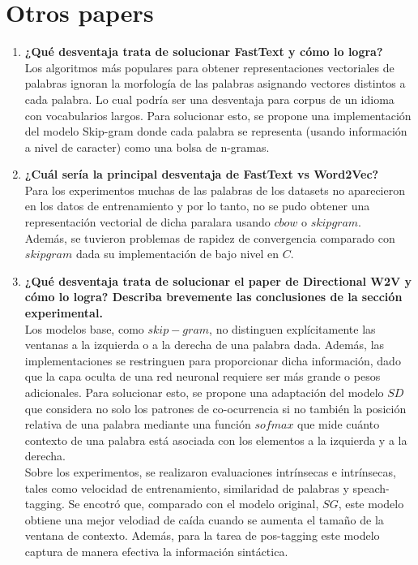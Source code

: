 \documentclass[11pt,letterpaper]{article}
\theoremstyle{definition}
\theoremstyle{definition}
\theoremstyle{definition}
\begin{document}
\section{Otros papers}
\begin{enumerate}
	\item \textbf{¿Qué desventaja trata de solucionar FastText y cómo lo logra?}
	\\
	Los algoritmos más populares para obtener representaciones vectoriales de palabras ignoran la morfología de las palabras asignando vectores distintos a cada palabra. Lo cual podría ser una desventaja para corpus de un idioma con vocabularios largos. Para solucionar esto, se propone una implementación del modelo Skip-gram donde cada palabra se representa (usando información a nivel de caracter) como una bolsa de n-gramas.
	\item \textbf{¿Cuál sería la principal desventaja de FastText vs Word2Vec?}	
	\\
	Para los experimentos muchas de las palabras de los datasets no aparecieron en los datos de entrenamiento y por lo tanto, no se pudo obtener una representación vectorial de dicha paralara usando $ cbow $ o $ skipgram $.
	\\
	Además, se tuvieron problemas de rapidez de convergencia comparado con $ skipgram $ dada su implementación de bajo nivel en $ C $.
	\item \textbf{¿Qué desventaja trata de solucionar el paper de Directional W2V y cómo lo logra? Describa brevemente las conclusiones de la sección experimental.}	
	\\
	Los modelos base, como $ skip-gram $, no distinguen explícitamente las ventanas a la izquierda o a la derecha de una palabra dada. Además, las implementaciones se restringuen para proporcionar dicha información, dado que la capa oculta de una red neuronal requiere ser más grande o pesos adicionales. Para solucionar esto, se propone una adaptación del modelo $ SD $ que considera no solo los patrones de co-ocurrencia si no también la posición relativa de una palabra mediante una función $ sofmax $ que mide cuánto contexto de una palabra está asociada con los elementos a la izquierda y a la derecha.
	\\
	Sobre los experimentos, se realizaron evaluaciones intrínsecas e intrínsecas, tales como velocidad de entrenamiento, similaridad de palabras y speach-tagging. Se encotró que, comparado con el modelo original, $ SG $, este modelo obtiene una mejor velodiad de caída cuando se aumenta el tamaño de la ventana de contexto. Además, para la tarea de pos-tagging este modelo captura de manera efectiva la información sintáctica.

\end{enumerate}
\end{document}
